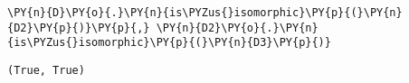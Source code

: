 \begin{itemize}
\begin{enumerate}
    \begin{tcolorbox}[breakable, size=fbox, boxrule=1pt, pad at break*=1mm,colback=cellbackground, colframe=cellborder]
\begin{Verbatim}[commandchars=\\\{\}]
\PY{n}{D}\PY{o}{.}\PY{n}{is\PYZus{}isomorphic}\PY{p}{(}\PY{n}{D2}\PY{p}{)}\PY{p}{,} \PY{n}{D2}\PY{o}{.}\PY{n}{is\PYZus{}isomorphic}\PY{p}{(}\PY{n}{D3}\PY{p}{)}
\end{Verbatim}
\end{tcolorbox}


\begin{tcolorbox}[breakable, size=fbox, boxrule=.5pt, pad at break*=1mm, opacityfill=0]
\begin{Verbatim}[commandchars=\\\{\}]
(True, True)
\end{Verbatim}
\end{tcolorbox}
        
  \end{enumerate}

\end{itemize}
 

    